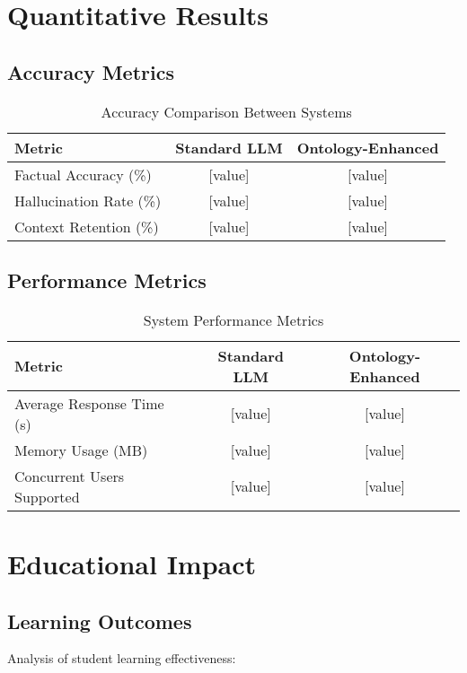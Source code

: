 \section{Quantitative Results}
\label{sec:quantitative-results}

\subsection{Accuracy Metrics}
\begin{table}[h]
    \centering
    \caption{Accuracy Comparison Between Systems}
    \label{tab:accuracy-comparison}
    \begin{tabular}{lcc}
        \toprule
        \textbf{Metric} & \textbf{Standard LLM} & \textbf{Ontology-Enhanced} \\
        \midrule
        Factual Accuracy (\%) & [value] & [value] \\
        Hallucination Rate (\%) & [value] & [value] \\
        Context Retention (\%) & [value] & [value] \\
        \bottomrule
    \end{tabular}
\end{table}

\subsection{Performance Metrics}
\begin{table}[h]
    \centering
    \caption{System Performance Metrics}
    \label{tab:performance-metrics}
    \begin{tabular}{lcc}
        \toprule
        \textbf{Metric} & \textbf{Standard LLM} & \textbf{Ontology-Enhanced} \\
        \midrule
        Average Response Time (s) & [value] & [value] \\
        Memory Usage (MB) & [value] & [value] \\
        Concurrent Users Supported & [value] & [value] \\
        \bottomrule
    \end{tabular}
\end{table}

\section{Educational Impact}
\label{sec:educational-impact}

\subsection{Learning Outcomes}
Analysis of student learning effectiveness:

